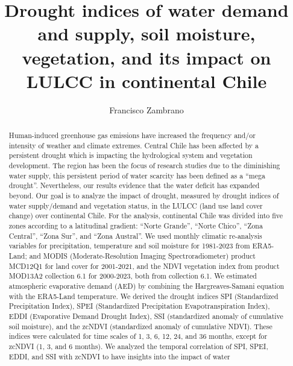 \documentclass[
  number,
  preprint,
  3p,
  onecolumn]{elsarticle}
\begin{document}
\begin{frontmatter}
\title{Drought indices of water demand and supply, soil moisture,
vegetation, and its impact on LULCC in continental Chile}
\author[1]{Francisco Zambrano%
%
}


        
\begin{abstract}
Human-induced greenhouse gas emissions have increased the frequency
and/or intensity of weather and climate extremes. Central Chile has been
affected by a persistent drought which is impacting the hydrological
system and vegetation development. The region has been the focus of
research studies due to the diminishing water supply, this persistent
period of water scarcity has been defined as a ``mega drought''.
Nevertheless, our results evidence that the water deficit has expanded
beyond. Our goal is to analyze the impact of drought, measured by
drought indices of water supply/demand and vegetation status, in the
LULCC (land use land cover change) over continental Chile. For the
analysis, continental Chile was divided into five zones according to a
latitudinal gradient: ``Norte Grande'', ``Norte Chico'', ``Zona
Central'', ``Zona Sur'', and ``Zona Austral''. We used monthly climatic
re-analysis variables for precipitation, temperature and soil moisture
for 1981-2023 from ERA5-Land; and MODIS (Moderate-Resolution Imaging
Spectroradiometer) product MCD12Q1 for land cover for 2001-2021, and the
NDVI vegetation index from product MOD13A2 collection 6.1 for 2000-2023,
both from collection 6.1. We estimated atmospheric evaporative demand
(AED) by combining the Hargreaves-Samani equation with the ERA5-Land
temperature. We derived the drought indices SPI (Standardized
Precipitation Index), SPEI (Standardized Precipitation
Evapotranspiration Index), EDDI (Evaporative Demand Drought Index), SSI
(standardized anomaly of cumulative soil moisture), and the zcNDVI
(standardized anomaly of cumulative NDVI). These indices were calculated
for time scales of 1, 3, 6, 12, 24, and 36 months, except for zcNDVI (1,
3, and 6 months). We analyzed the temporal correlation of SPI, SPEI,
EDDI, and SSI with zcNDVI to have insights into the impact of water

\end{abstract}
\end{frontmatter}
\end{document}
